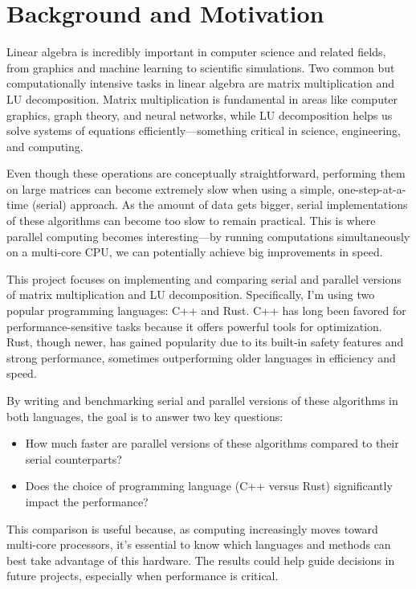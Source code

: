 \documentclass[12pt]{article}
\begin{document}
\section{Background and Motivation}
Linear algebra is incredibly important in computer science and related fields, from graphics and machine learning to scientific simulations.
Two common but computationally intensive tasks in linear algebra are matrix multiplication and LU decomposition. Matrix multiplication is fundamental
in areas like computer graphics, graph theory, and neural networks, while LU decomposition helps us solve systems of equations
efficiently---something critical in science, engineering, and computing.

Even though these operations are conceptually straightforward, performing them on large matrices can become extremely slow when using a simple,
one-step-at-a-time (serial) approach. As the amount of data gets bigger, serial implementations of these algorithms can become too slow to remain practical. This is
where parallel computing becomes interesting---by running computations simultaneously on a multi-core CPU, we can potentially
achieve big improvements in speed.

This project focuses on implementing and comparing serial and parallel versions of matrix multiplication and LU decomposition. Specifically,
I'm using two popular programming languages: C++ and Rust. C++ has long been favored for performance-sensitive tasks because it offers powerful
tools for optimization. Rust, though newer, has gained popularity due to its built-in safety features and strong performance, sometimes outperforming
older languages in efficiency and speed.

By writing and benchmarking serial and parallel versions of these algorithms in both languages, the goal is to answer two key questions:

\begin{itemize}
    \item How much faster are parallel versions of these algorithms compared to their serial counterparts?
    \item Does the choice of programming language (C++ versus Rust) significantly impact the performance?
\end{itemize}

This comparison is useful because, as computing increasingly moves toward multi-core processors, it's essential to know which languages and methods can
best take advantage of this hardware. The results could help guide decisions in future projects, especially when performance is critical.
\end{document}

